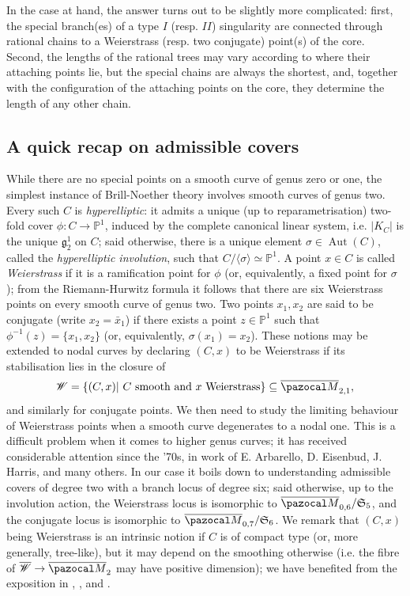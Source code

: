 \documentclass{compositio}
\newcommand{\PP}{\mathbb P}
\renewcommand{\to}{\rightarrow}
\newcommand{\oM}{\overline{\pazocal M}}
\newcommand{\Aut}{\operatorname{Aut}}
\theoremstyle{plain}
\theoremstyle{definition}
\theoremstyle{remark}
\begin{document}
In the case at hand, the answer turns out to be slightly more complicated: first, the special branch(es) of a type $I$ (resp. $I\!I$) singularity are connected through rational chains to a Weierstrass (resp. two conjugate) point(s) of the core. Second, the lengths of the rational trees may vary according to where their attaching points lie, but the special chains are always the shortest, and, together with the configuration of the attaching points on the core, they determine the length of any other chain.

\subsection{A quick recap on admissible covers}\label{rmk:Wandconj}
 While there are no special points on a smooth curve of genus zero or one, the simplest instance of Brill-Noether theory involves smooth curves of genus two. Every such $C$ is \emph{hyperelliptic}: it admits a unique (up to reparametrisation) two-fold cover $\phi\colon C\to\PP^1$, induced by the complete canonical linear system, i.e. $\lvert K_C\rvert$ is the unique $\mathfrak g^1_2$ on $C$; said otherwise, there is a unique element $\sigma\in\Aut(C)$, called the \emph{hyperelliptic involution}, such that $C/\langle\sigma\rangle\simeq\PP^1$. A point $x\in C$ is called \emph{Weierstrass} if it is a ramification point for $\phi$ (or, equivalently, a fixed point for $\sigma$); from the Riemann-Hurwitz formula it follows that there are six Weierstrass points on every smooth curve of genus two. Two points $x_1,x_2$ are said to be conjugate (write $x_2=\bar x_1$) if there exists a point $z\in\PP^1$ such that $\phi^{-1}(z)=\{x_1,x_2\}$ (or, equivalently, $\sigma(x_1)=x_2$). These notions may be extended to nodal curves by declaring $(C,x)$ to be Weierstrass if its stabilisation lies in the closure of
 \[\mathcal W=\{(C,x)|\ C\text{ smooth and } x \text{ Weierstrass}\}\subseteq\oM_{2,1},\]
 and similarly for conjugate points. We then need to study the limiting behaviour of Weierstrass points when a smooth curve degenerates to a nodal one. This is a difficult problem when it comes to higher genus curves; it has received considerable attention since the '70s, in work of E. Arbarello, D. Eisenbud, J. Harris, and many others. In our case it boils down to understanding admissible covers \cite{HarrisMumford} of degree two with a branch locus of degree six; said otherwise, up to the involution action, the Weierstrass locus is isomorphic to $\oM_{0,6}/\mathfrak S_5$, and the conjugate locus is isomorphic to  $\oM_{0,7}/\mathfrak S_6$. We remark that $(C,x)$ being Weierstrass is an intrinsic notion if $C$ is of compact type (or, more generally, tree-like), but it may depend on the smoothing otherwise (i.e. the fibre of $\overline{\mathcal W}\to\oM_2$ may have positive dimension); we have benefited from the exposition in \cite[Appendix 2]{Diaz}, \cite[Proposition (3.0.6)]{Cukierman}, and \cite[Theorem 5.45]{HM}.
\end{document}
